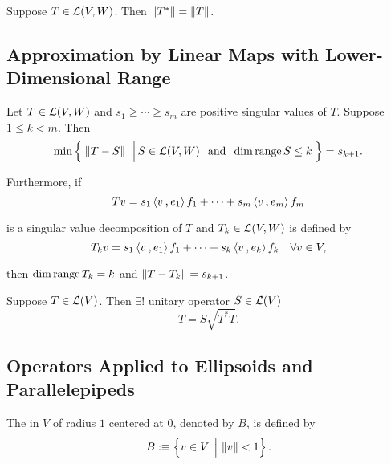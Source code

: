 \begin{thm}
  \label{thm: norm of the adjoint}
  Suppose $T \in \mathcal{L}(V,W)$. Then $\left \lVert T^* \right \rVert = \left \lVert T \right \rVert$.
\end{thm}

\subsection{Approximation by Linear Maps with Lower-Dimensional Range}

\begin{thm}
  Let $T \in \mathcal{L} (V,W)$ and $s_1 \geq \cdots \geq s_m$ are positive singular values of $T$. Suppose $1 \leq k < m$. Then
  \[
    \min \left\{ \; \left \lVert T-S \right \rVert \; \,\Big\vert\, S \in \mathcal{L} (V,W) \;\;\, \text{and}\;\; \dim \operatorname{range} S \leq k \; \right\} = s_{k+1}.
  \]

  Furthermore, if
  \[
    Tv = s_1 \ip{v}{e_1}f_1 + \cdots + s_m \ip{v}{e_m}f_m
  \]

  is a singular value decomposition of $T$ and $T_k \in \mathcal{L}(V,W)$ is defined by
  \[
    T_k v = s_1 \ip{v}{e_1}f_1 + \cdots + s_k \ip{v}{e_k}f_k \quad \forall v \in V,
  \]

  then $\dim \operatorname{range} T_k = k$ and $\left \lVert T-T_k \right \rVert = s_{k+1}$.
\end{thm}


\begin{thm}
  Suppose $T\in \mathcal{L}(V)$. Then $\exists!$ unitary operator $S\in \mathcal{L}(V)$ \st
  \[
    T=S\sqrt{T^*T}.
  \]
\end{thm}

\subsection{Operators Applied to Ellipsoids and Parallelepipeds}
\begin{thm}[ball, $B$]
  The  in $V$ of radius $1$ centered at $0$, denoted by $B$, is defined by
  \[
    B :\equiv \left\{v \in V \; \,\Big\vert\, \left \lVert v \right \rVert < 1  \right\}.
  \]
\end{thm}